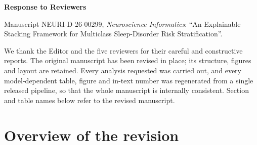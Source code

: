 \documentclass[11pt,a4paper]{article}
\begin{document}
\begin{center}\Large\textbf{Response to Reviewers}\end{center}
\noindent Manuscript NEURI-D-26-00299, \emph{Neuroscience Informatics}: ``An Explainable Stacking Framework for Multiclass Sleep-Disorder Risk Stratification''.

\medskip\noindent We thank the Editor and the five reviewers for their careful and constructive reports. The original manuscript has been revised in place; its structure, figures and layout are retained. Every analysis requested was carried out, and every model-dependent table, figure and in-text number was regenerated from a single released pipeline, so that the whole manuscript is internally consistent. Section and table names below refer to the revised manuscript.

\section*{Overview of the revision}
\end{document}

